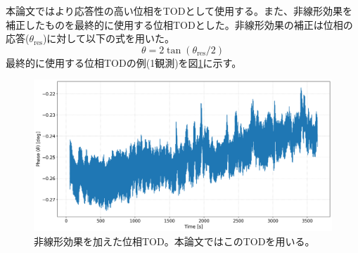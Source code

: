 本論文ではより応答性の高い位相をTODとして使用する。また、非線形効果を補正したものを最終的に使用する位相TODとした。非線形効果の補正は位相の応答($\theta_{\mathrm{res}}$)に対して以下の式\cite{sueno_doctor}を用いた。
\begin{equation}
  \theta = 2\tan(\theta_{\mathrm{res}}/2)
\end{equation}
最終的に使用する位相TODの例(1観測)を図\ref{raw_phase}に示す。
\begin{figure}[htbp]
  \centering
  \includegraphics[width=0.95\columnwidth]{5_alignment/figs/raw_phase_deg.png}
  \caption{非線形効果を加えた位相TOD。本論文ではこのTODを用いる。}
  \label{raw_phase}
\end{figure}


